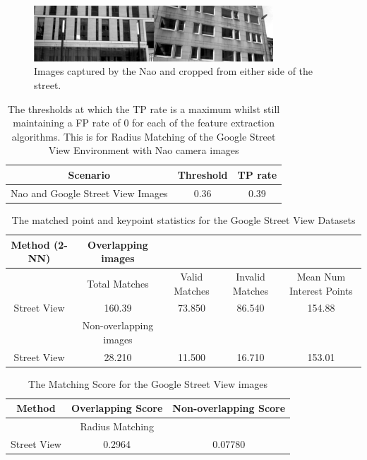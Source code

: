 \documentclass[11pt]{report}
\begin{document}
 \begin{figure}[h!] 
  \centering
    \includegraphics[width=0.8\textwidth]{../Drawings/streetView/similarGooglePics.jpg}
    \caption{Images captured by the Nao and cropped from either side of the street.}
    \label{fig:similarGoogleStreetView}
\end{figure}


\begin{table}
\caption{The thresholds at which the TP rate is a maximum whilst still maintaining
a FP rate of 0 for each of the feature extraction algorithms. This
is for Radius Matching of the Google Street View Environment with
Nao camera images}
\begin{tabular}{|c|c|c|}
\hline 
Scenario & Threshold & TP rate\tabularnewline
\hline 
\hline 
Nao and Google Street View Images & 0.36 & 0.39\tabularnewline
\hline 
\end{tabular}
\label{tab:tpStreetView}
\end{table}

\begin{table}
\caption{The matched point and keypoint statistics for the Google Street View
Datasets}
\begin{tabular}{|c|c|c|c|c|}
\hline 
Method (2-NN) & Overlapping images &  &  & \tabularnewline
\hline 
\hline 
 & Total Matches & Valid Matches & Invalid Matches & Mean Num Interest Points\tabularnewline
\hline 
Street View  & 160.39 & 73.850 & 86.540 & 154.88\tabularnewline
\hline 
 & Non-overlapping images &  &  & \tabularnewline
\hline 
Street View & 28.210 & 11.500 & 16.710 & 153.01\tabularnewline
\hline 
\end{tabular}
\label{tab:gsMK}
\end{table}

\begin{table}
\caption{The Matching Score for the Google Street View images}
\begin{tabular}{|c|c|c|}
\hline 
Method & Overlapping Score & Non-overlapping Score\tabularnewline
\hline 
\hline 
 & Radius Matching & \tabularnewline
\hline 
Street View & 0.2964 & 0.07780\tabularnewline
\hline 
\end{tabular}
\label{tab:gsMS}
\end{table}
\end{document}

